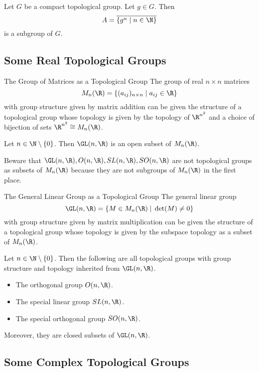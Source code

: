 \documentclass[a4paper]{article}
\begin{document}
\begin{prp}{}{} Let $G$ be a compact topological group. Let $g\in G$. Then $$A=\overline{\{g^n\;|\;n\in\N\}}$$ is a subgroup of $G$. 
\end{prp}

\subsection{Some Real Topological Groups}
\begin{prp}{The Group of Matrices as a Topological Group}{} The group of real $n\times n$ matrices $$M_n(\R)=\{(a_{ij})_{n\times n}\;|\;a_{ij}\in\R\}$$ with group structure given by matrix addition can be given the structure of a topological group whose topology is given by the topology of $\R^{n^2}$ and a choice of bijection of sets $\R^{n^2}\cong M_n(\R)$. 
\end{prp}

\begin{prp}{}{} Let $n\in\N\setminus\{0\}$. Then $\GL(n,\R)$ is an open subset of $M_n(\R)$. 
\end{prp}

Beware that $\GL(n,\R),O(n,\R),SL(n,\R),SO(n,\R)$ are not topological groups as subsets of $M_n(\R)$ because they are not subgroups of $M_n(\R)$ in the first place. 

\begin{prp}{The General Linear Group as a Topological Group}{} The general linear group $$\GL(n,\R)=\{M\in M_n(\R)\;|\;\det(M)\neq 0\}$$ with group structure given by matrix multiplication can be given the structure of a topological group whose topology is given by the subspace topology as a subset of $M_n(\R)$. 
\end{prp}

\begin{prp}{}{} Let $n\in\N\setminus\{0\}$. Then the following are all topological groups with group structure and topology inherited from $\GL(n,\R)$. 
\begin{itemize}
\item The orthogonal group $O(n,\R)$. 
\item The special linear group $SL(n,\R)$. 
\item The special orthogonal group $SO(n,\R)$. 
\end{itemize}
Moreover, they are closed subsets of $\GL(n,\R)$. 
\end{prp}

\subsection{Some Complex Topological Groups}
\end{document}
